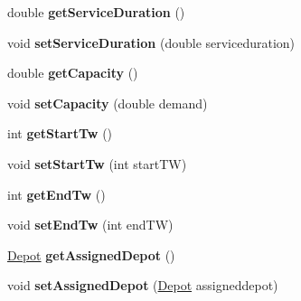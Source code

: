 \begin{DoxyCompactItemize}
\item 
double {\bfseries get\+Service\+Duration} ()\hypertarget{classsvrptw_1_1_customer_a093693af93071c60f7f95a5a70df8e24}{}\label{classsvrptw_1_1_customer_a093693af93071c60f7f95a5a70df8e24}

\item 
void {\bfseries set\+Service\+Duration} (double serviceduration)\hypertarget{classsvrptw_1_1_customer_acd0bdd0f906a858e531ed7358c61536b}{}\label{classsvrptw_1_1_customer_acd0bdd0f906a858e531ed7358c61536b}

\item 
double {\bfseries get\+Capacity} ()\hypertarget{classsvrptw_1_1_customer_aba06aeba3b8f62af403ccafc45aa7d3e}{}\label{classsvrptw_1_1_customer_aba06aeba3b8f62af403ccafc45aa7d3e}

\item 
void {\bfseries set\+Capacity} (double demand)\hypertarget{classsvrptw_1_1_customer_a8223e9159149dfdaa5007b939884103b}{}\label{classsvrptw_1_1_customer_a8223e9159149dfdaa5007b939884103b}

\item 
int {\bfseries get\+Start\+Tw} ()\hypertarget{classsvrptw_1_1_customer_a549f300ebf7fe45a769d7840e625208e}{}\label{classsvrptw_1_1_customer_a549f300ebf7fe45a769d7840e625208e}

\item 
void {\bfseries set\+Start\+Tw} (int start\+TW)\hypertarget{classsvrptw_1_1_customer_a7e7abcc64fef8aba54dc52db08dfbd8d}{}\label{classsvrptw_1_1_customer_a7e7abcc64fef8aba54dc52db08dfbd8d}

\item 
int {\bfseries get\+End\+Tw} ()\hypertarget{classsvrptw_1_1_customer_aa28abc617b91702c94d878c74c6e57a4}{}\label{classsvrptw_1_1_customer_aa28abc617b91702c94d878c74c6e57a4}

\item 
void {\bfseries set\+End\+Tw} (int end\+TW)\hypertarget{classsvrptw_1_1_customer_a989bd84716b89a74b0be8a55134434ac}{}\label{classsvrptw_1_1_customer_a989bd84716b89a74b0be8a55134434ac}

\item 
\hyperlink{classsvrptw_1_1_depot}{Depot} {\bfseries get\+Assigned\+Depot} ()\hypertarget{classsvrptw_1_1_customer_acad112600a028a35e9c8136ebf2bd6b1}{}\label{classsvrptw_1_1_customer_acad112600a028a35e9c8136ebf2bd6b1}

\item 
void {\bfseries set\+Assigned\+Depot} (\hyperlink{classsvrptw_1_1_depot}{Depot} assigneddepot)\hypertarget{classsvrptw_1_1_customer_a9d0ca6c9d624d600016e8898bf653a27}{}\label{classsvrptw_1_1_customer_a9d0ca6c9d624d600016e8898bf653a27}


\end{DoxyCompactItemize}
